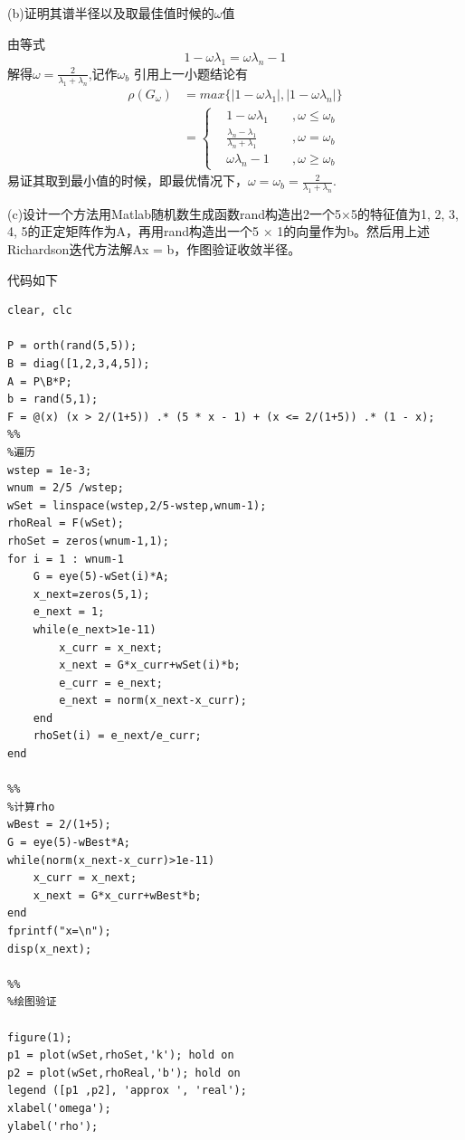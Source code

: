 \documentclass[12pt,a4paper,utf8]{ctexart}
\begin{document}
\begin{enumerate}
(b)证明其谱半径以及取最佳值时候的$ \omega $值

由等式
\begin{equation}
	1-\omega \lambda_1 = \omega \lambda_n -1 \nonumber
\end{equation}
解得$ \omega = \frac{2}{\lambda_1+\lambda_n} $,记作$ \omega_b $
引用上一小题结论有
\begin{equation}
	\begin{aligned}
		\rho(G_{\omega }) & = max\{|1-\omega \lambda_1| , |1-\omega \lambda_n| \} \\
						& = \left\{\begin{aligned}
								& 1 - \omega \lambda_1\quad &,\omega \le \omega_b \\
								&\frac{\lambda_n - \lambda_1}{\lambda_n+\lambda_1}\quad &,\omega = \omega_b \\
								&\omega \lambda_n - 1\quad &,\omega \ge \omega_b
							\end{aligned}\right.
	\end{aligned}
	\nonumber
\end{equation}
易证其取到最小值的时候，即最优情况下，$ \omega = \omega_b = \frac{2}{\lambda_1+\lambda_n}$.


(c)设计一个方法用Matlab随机数生成函数rand构造出2一个5×5的特征值为1, 2, 3, 4, 5的正定矩阵作为A，再用rand构造出一个5 × 1的向量作为b。然后用上述Richardson迭代方法解Ax = b，作图验证收敛半径。

代码如下
\begin{lstlisting}[frame=single]
clear, clc

P = orth(rand(5,5));
B = diag([1,2,3,4,5]);
A = P\B*P;
b = rand(5,1);
F = @(x) (x > 2/(1+5)) .* (5 * x - 1) + (x <= 2/(1+5)) .* (1 - x);
%%
%遍历
wstep = 1e-3;
wnum = 2/5 /wstep;
wSet = linspace(wstep,2/5-wstep,wnum-1);
rhoReal = F(wSet);
rhoSet = zeros(wnum-1,1);
for i = 1 : wnum-1
	G = eye(5)-wSet(i)*A;
	x_next=zeros(5,1);
	e_next = 1;
	while(e_next>1e-11)
		x_curr = x_next;
		x_next = G*x_curr+wSet(i)*b;
		e_curr = e_next;
		e_next = norm(x_next-x_curr);
	end
	rhoSet(i) = e_next/e_curr;
end

%%
%计算rho
wBest = 2/(1+5);
G = eye(5)-wBest*A;
while(norm(x_next-x_curr)>1e-11)
	x_curr = x_next;
	x_next = G*x_curr+wBest*b;
end
fprintf("x=\n");
disp(x_next);

%%
%绘图验证

figure(1);
p1 = plot(wSet,rhoSet,'k'); hold on
p2 = plot(wSet,rhoReal,'b'); hold on
legend ([p1 ,p2], 'approx ', 'real');
xlabel('omega');
ylabel('rho');


\end{lstlisting}
\end{enumerate}
\end{document}
